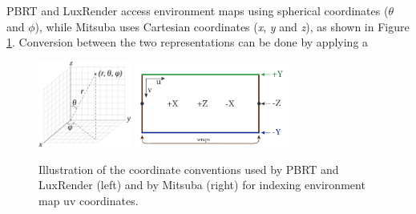 PBRT and LuxRender access environment maps using spherical coordinates ($\theta$ and $\phi$), while 
Mitsuba uses Cartesian coordinates (\textit{x}, \textit{y} and \textit{z}), as  
shown in Figure \ref{fig:mitdocemitter}. Conversion between the two representations can be done by applying a  

\begin{figure}[h]
\centering
\includegraphics[width=1.2in]{figs/3_system_architecture/spherical_coordinates.png}
\includegraphics[width=2.0in]{figs/3_system_architecture/mitdocemitter.png}
\caption{Illustration of the coordinate conventions used by PBRT and LuxRender 
(left) and by Mitsuba (right) for indexing environment map uv coordinates.}
\label{fig:mitdocemitter}
\end{figure}


